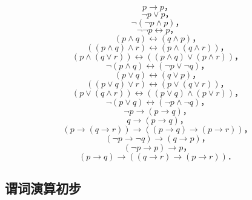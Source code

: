 \[ p \to p                                                             \text{，} \tag{同一律} \]
\[ \lnot{}p \lor p                                                     \text{，} \tag{排中律} \]
\[ \lnot(\lnot{}p \land p)                                             \text{，} \tag{矛盾律} \]
\[ \lnot\lnot{}p \leftrightarrow p                                     \text{，} \tag{双重否定律} \]
\[ (p \land q) \leftrightarrow (q \land p)                             \text{，} \tag{合取交换律} \]
\[ ((p \land q) \land r) \leftrightarrow (p \land (q \land r))         \text{，} \tag{合取结合律} \]
\[ (p \land (q \lor r)) \leftrightarrow ((p \land q) \lor (p \land r)) \text{，} \tag{分配律} \]
\[ \lnot(p \land q) \leftrightarrow (\lnot{}p \lor \lnot{}q)           \text{，} \tag{De Morgan 律} \]
\[ (p \lor q) \leftrightarrow (q \lor p)                               \text{，} \tag{析取交换律} \]
\[ ((p \lor q) \lor r) \leftrightarrow (p \lor (q \lor r))             \text{，} \tag{析取结合律} \]
\[ (p \lor (q \land r)) \leftrightarrow ((p \lor q) \land (p \lor r))  \text{，} \tag{分配律} \]
\[ \lnot(p \lor q) \leftrightarrow (\lnot{}p \land \lnot{}q)           \text{，} \tag{De Morgan 律} \]
\[ \lnot{}p \to (p \to q)                                              \text{，} \tag{否定前件律} \]
\[ q \to (p \to q)                                                     \text{，} \tag{肯定后件律} \]
\[ (p \to (q \to r)) \to ((p \to q) \to (p \to r))                     \text{，} \tag{蕴含词分配律} \]
\[ (\lnot{}p \to \lnot{}q) \to (q \to p)                               \text{，} \tag{换位律} \]
\[ (\lnot{}p \to p) \to p                                              \text{，} \tag{否定肯定律} \]
\[ (p \to q) \to ((q \to r) \to (p \to r))                             \text{．} \tag{假设三段论} \]

\subsection{谓词演算初步}

